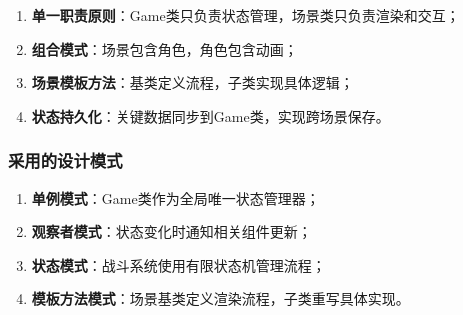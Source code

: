 \documentclass[a4paper,12pt]{article}
\begin{document}
\begin{enumerate}[label=(\arabic*)]
    \item \textbf{单一职责原则}：Game类只负责状态管理，场景类只负责渲染和交互；
    \item \textbf{组合模式}：场景包含角色，角色包含动画；
    \item \textbf{场景模板方法}：基类定义流程，子类实现具体逻辑；
    \item \textbf{状态持久化}：关键数据同步到Game类，实现跨场景保存。
\end{enumerate}

\subsubsection{采用的设计模式}

\begin{enumerate}[label=(\arabic*)]
    \item \textbf{单例模式}：Game类作为全局唯一状态管理器；
    \item \textbf{观察者模式}：状态变化时通知相关组件更新；
    \item \textbf{状态模式}：战斗系统使用有限状态机管理流程；
    \item \textbf{模板方法模式}：场景基类定义渲染流程，子类重写具体实现。
\end{enumerate}
\end{document}
